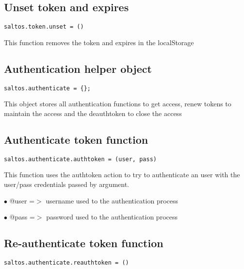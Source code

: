 \documentclass[a4paper]{book}
\begin{document}
\hypertarget{toc411}{}
\subsection{Unset token and expires}

\begin{lstlisting}
saltos.token.unset = ()
\end{lstlisting}

This function removes the token and expires in the localStorage

\hypertarget{toc412}{}
\subsection{Authentication helper object}

\begin{lstlisting}
saltos.authenticate = {};
\end{lstlisting}

This object stores all authentication functions to get access, renew tokens to maintain
the access and the deauthtoken to close the access

\hypertarget{toc413}{}
\subsection{Authenticate token function}

\begin{lstlisting}
saltos.authenticate.authtoken = (user, pass)
\end{lstlisting}

This function uses the authtoken action to try to authenticate an user with the user/pass
credentials passed by argument.

\begin{compactitem}
\item[\color{myblue}$\bullet$] @user =$>$ username used to the authentication process
\item[\color{myblue}$\bullet$] @pass =$>$ password used to the authentication process
\end{compactitem}

\hypertarget{toc414}{}
\subsection{Re-authenticate token function}

\begin{lstlisting}
saltos.authenticate.reauthtoken = ()
\end{lstlisting}
\end{document}
